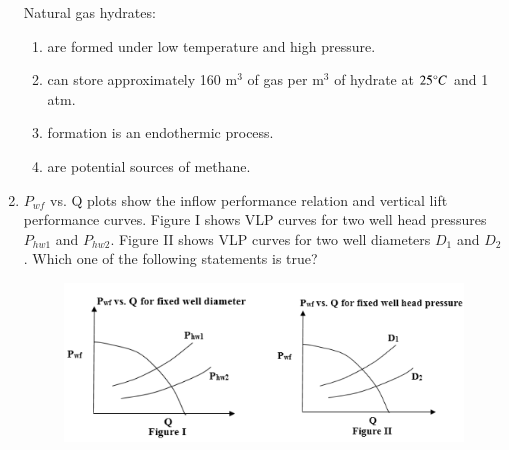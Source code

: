 \documentclass[journal,12pt,onecolumn]{IEEEtran}
\theoremstyle{remark}
\begin{document}
\begin{enumerate}
\noindent
Natural gas hydrates:

\begin{enumerate}
\item are formed under low temperature and high pressure.
\item can store approximately 160 m$^3$ of gas per m$^3$ of hydrate at $25{\degree}C$ and 1 atm.
\item formation is an endothermic process.
\item are potential sources of methane.
\end{enumerate}

\begin{enumerate} 
\end{enumerate}

\pagebreak

\item $P_{wf}$  vs. Q  plots show the inflow performance relation  and vertical lift performance  curves. Figure I shows VLP curves for two well head pressures $P_{hw1}$ and $P_{hw2}$. Figure II shows VLP curves for two well diameters $D_1$ and $D_2$. Which one of the following statements is true?

\hfill{}

\begin{figure}[h!]
  \centering
  \includegraphics[width=0.8\columnwidth]{figs/pic9.png} 
   \caption*{}
  \label{fig:Q38}
\end{figure}

\begin{enumerate}
\end{enumerate}


\end{enumerate}
\end{document}
